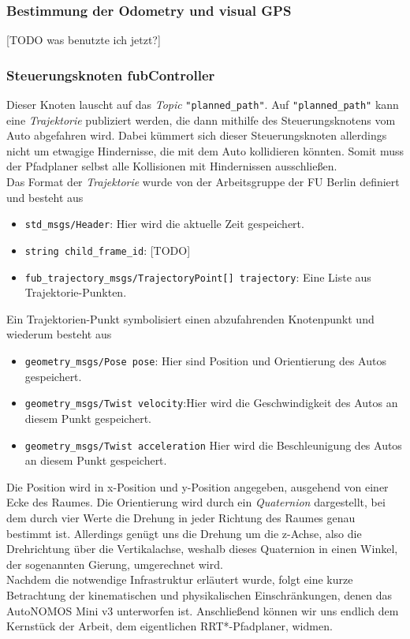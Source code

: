 \subsubsection{Bestimmung der Odometry und visual GPS}
[TODO was benutzte ich jetzt?]

\subsubsection{Steuerungsknoten fubController}
Dieser Knoten lauscht auf das \textit{Topic} \verb|"planned_path"|. Auf \verb|"planned_path"| kann eine \textit{Trajektorie} publiziert werden, die dann mithilfe des Steuerungsknotens vom Auto abgefahren wird. Dabei kümmert sich dieser Steuerungsknoten allerdings nicht um etwagige Hindernisse, die mit dem Auto kollidieren könnten. Somit muss der Pfadplaner selbst alle Kollisionen mit Hindernissen ausschließen. \\
Das Format der \textit{Trajektorie} wurde von der Arbeitsgruppe der FU Berlin definiert und besteht aus
\begin{itemize}
\item \verb|std_msgs/Header|: Hier wird die aktuelle Zeit gespeichert.
\item \verb|string child_frame_id|: [TODO]
\item \verb|fub_trajectory_msgs/TrajectoryPoint[] trajectory|: Eine Liste aus Trajektorie-Punkten.
\end{itemize}
Ein Trajektorien-Punkt symbolisiert einen abzufahrenden Knotenpunkt und wiederum besteht aus
\begin{itemize}
\item \verb|geometry_msgs/Pose pose|: Hier sind Position und Orientierung des Autos gespeichert.
\item \verb|geometry_msgs/Twist velocity|:Hier wird die Geschwindigkeit des Autos an diesem Punkt gespeichert.
\item \verb|geometry_msgs/Twist acceleration| Hier wird die Beschleunigung des Autos an diesem Punkt gespeichert.
\end{itemize}
Die Position wird in x-Position und y-Position angegeben, ausgehend von einer Ecke des Raumes. Die Orientierung wird durch ein \textit{Quaternion} dargestellt, bei dem durch vier Werte die Drehung in jeder Richtung des Raumes genau bestimmt ist. Allerdings genügt uns die Drehung um die z-Achse, also die Drehrichtung über die Vertikalachse, weshalb dieses Quaternion in einen Winkel, der sogenannten Gierung, umgerechnet wird.
\\
Nachdem die notwendige Infrastruktur erläutert wurde, folgt eine kurze Betrachtung der kinematischen und physikalischen Einschränkungen, denen das AutoNOMOS Mini v3 unterworfen ist. Anschließend können wir uns endlich dem Kernstück der Arbeit, dem eigentlichen RRT*-Pfadplaner, widmen.

